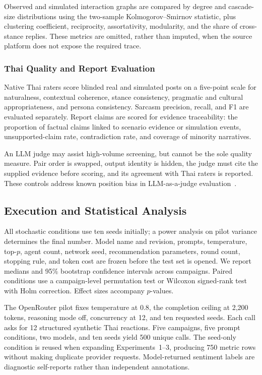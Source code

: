 \documentclass[conference]{IEEEtran}
\begin{document}
Observed and simulated interaction graphs are compared by degree and cascade-
size distributions using the two-sample Kolmogorov--Smirnov statistic, plus
clustering coefficient, reciprocity, assortativity, modularity, and the share
of cross-stance replies. These metrics are omitted, rather than imputed, when
the source platform does not expose the required trace.

\subsubsection{Thai Quality and Report Evaluation}

Native Thai raters score blinded real and simulated posts on a five-point scale
for naturalness, contextual coherence, stance consistency, pragmatic and
cultural appropriateness, and persona consistency. Sarcasm precision, recall,
and F1 are evaluated separately. Report claims are scored for evidence
traceability: the proportion of factual claims linked to scenario evidence or
simulation events, unsupported-claim rate, contradiction rate, and coverage of
minority narratives.

An LLM judge may assist high-volume screening, but cannot be the sole quality
measure. Pair order is swapped, output identity is hidden, the judge must cite
the supplied evidence before scoring, and its agreement with Thai raters is
reported. These controls address known position bias in LLM-as-a-judge
evaluation~\cite{shi2024judging}.

\subsection{Execution and Statistical Analysis}

All stochastic conditions use ten seeds initially; a power analysis on pilot
variance determines the final number. Model name and revision, prompts,
temperature, top-$p$, agent count, network seed, recommendation parameters,
round count, stopping rule, and token cost are frozen before the test set is
opened. We report medians and 95\% bootstrap confidence intervals across
campaigns. Paired conditions use a campaign-level permutation test or Wilcoxon
signed-rank test with Holm correction. Effect sizes accompany $p$-values.

The OpenRouter pilot fixes temperature at 0.8, the completion ceiling at 2,200
tokens, reasoning mode off, concurrency at 12, and ten requested seeds. Each
call asks for 12 structured synthetic Thai reactions. Five campaigns, five
prompt conditions, two models, and ten seeds yield 500 unique calls. The
seed-only condition is reused when expanding Experiments~1--3, producing 750
metric rows without making duplicate provider requests. Model-returned
sentiment labels are diagnostic self-reports rather than independent
annotations.
\end{document}
